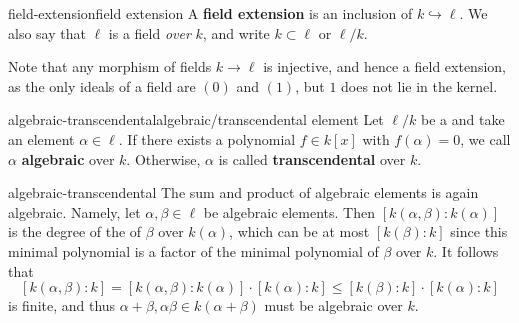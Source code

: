 \begin{topic}{field-extension}{field extension}
    A \textbf{field extension} is an inclusion of  $k \hookrightarrow \ell$. We also say that $\ell$ is a field \textit{over} $k$, and write $k \subset \ell$ or $\ell / k$.
    
    Note that any morphism of fields $k \to \ell$ is injective, and hence a field extension, as the only ideals of a field are $(0)$ and $(1)$, but $1$ does not lie in the kernel.
\end{topic}

\begin{topic}{algebraic-transcendental}{algebraic/transcendental element}
    Let $\ell / k$ be a  and take an element $\alpha \in \ell$. If there exists a polynomial $f \in k[x]$ with $f(\alpha) = 0$, we call $\alpha$ \textbf{algebraic} over $k$. Otherwise, $\alpha$ is called \textbf{transcendental} over $k$.
\end{topic}

\begin{example}{algebraic-transcendental}
    The sum and product of algebraic elements is again algebraic. Namely, let $\alpha, \beta \in \ell$ be algebraic elements. Then $[k(\alpha, \beta) : k(\alpha)]$ is the degree of the  of $\beta$ over $k(\alpha)$, which can be at most $[k(\beta) : k]$ since this minimal polynomial is a factor of the minimal polynomial of $\beta$ over $k$. It follows that
    \[ [k(\alpha, \beta) : k] = [k(\alpha, \beta) : k(\alpha)] \cdot [k(\alpha) : k] \le [k(\beta) : k] \cdot [k(\alpha) : k] \]
    is finite, and thus $\alpha + \beta, \alpha \beta \in k(\alpha + \beta)$ must be algebraic over $k$.
    
\end{example}

